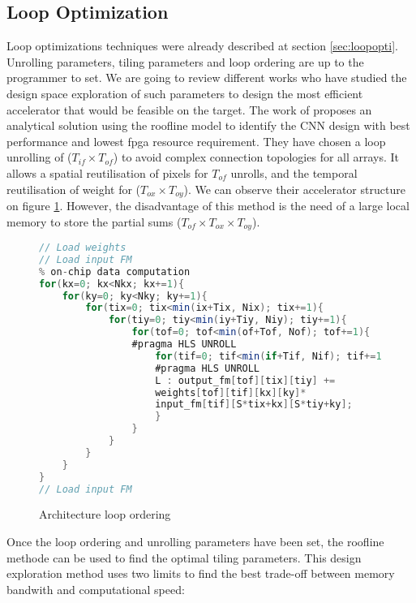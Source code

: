 \subsection{Loop Optimization} \label{subsec:loopopti}
%
%
Loop optimizations techniques were already described at section \ref{sec:loopopti}. Unrolling parameters, tiling parameters and loop ordering are up to the programmer to set. We are going to review different works who have studied the design space exploration of such parameters to design the most efficient accelerator that would be feasible on the target. \newline \newline
%
The work of \cite{zhang_optimizing_2015} proposes an analytical solution using the roofline model \cite{williams_roofline_2009} to identify the CNN design with best performance and lowest \acrshort{fpga} resource requirement. They have chosen a loop unrolling of ($T_{if} \times T_{of}$) to avoid complex connection topologies for all arrays. It allows a spatial reutilisation of pixels for $T_{of}$ unrolls, and the temporal reutilisation of weight for ($T_{ox} \times T_{oy}$). We can observe their accelerator structure on figure \ref{lst:accelerator}. However, the disadvantage of this method is the need of a large local memory to store the partial sums ($T_{of} \times T_{ox} \times T_{oy}$).
%
\begin{figure}
    \centering
    \begin{lstlisting}[language=Java]
// Load weights
// Load input FM
% on-chip data computation
for(kx=0; kx<Nkx; kx+=1){
    for(ky=0; ky<Nky; ky+=1){
        for(tix=0; tix<min(ix+Tix, Nix); tix+=1){
            for(tiy=0; tiy<min(iy+Tiy, Niy); tiy+=1){
                for(tof=0; tof<min(of+Tof, Nof); tof+=1){
                #pragma HLS UNROLL
                    for(tif=0; tif<min(if+Tif, Nif); tif+=1){
                    #pragma HLS UNROLL
                    L : output_fm[tof][tix][tiy] +=
                    weights[tof][tif][kx][ky]*
                    input_fm[tif][S*tix+kx][S*tiy+ky];
                    }
                }
            }
        }
    }
}
// Load input FM
    \end{lstlisting}
    \caption{Architecture loop ordering \cite{zhang_optimizing_2015}}
    \label{lst:accelerator}
\end{figure} \newline
%
Once the loop ordering and unrolling parameters have been set, the roofline methode can be used to find the optimal tiling parameters. This design exploration method uses two limits to find the best trade-off between memory bandwith and computational speed:
